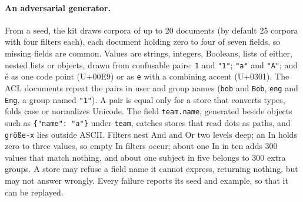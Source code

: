 \paragraph{An adversarial generator.}
From a seed, the kit draws corpora of up to 20 documents (by default 25 corpora with four filters
each), each document holding zero to four of seven fields, so missing fields are common. Values are
strings, integers, Booleans, lists of either, nested lists or objects, drawn from confusable pairs:
\texttt{1} and \texttt{"1"}; \texttt{"a"} and \texttt{"A"}; and \'e as one code point (U+00E9) or as
\texttt{e} with a combining accent (U+0301). The ACL documents repeat the pairs in user and group
names (\texttt{bob} and \texttt{Bob}, \texttt{eng} and \texttt{Eng}, a group named \texttt{"1"}). A
pair is equal only for a store that converts types, folds case or normalizes Unicode. The field
\texttt{team.name}, generated beside objects such as \texttt{\{"name": "a"\}} under \texttt{team},
catches stores that read dots as paths, and \texttt{gr\"o\ss e-x} lies outside ASCII. Filters nest
And and Or two levels deep; an In holds zero to three values, so empty In filters occur; about one In
in ten adds 300 values that match nothing, and about one subject in five belongs to 300 extra groups.
A store may refuse a field name it cannot express, returning nothing, but may not answer wrongly.
Every failure reports its seed and example, so that it can be replayed.

